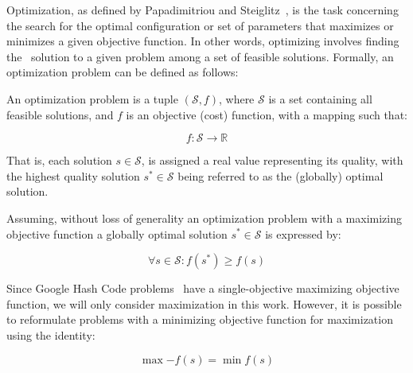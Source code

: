 Optimization, as defined by Papadimitriou and
Steiglitz~\cite{papadimitriou1998combinatorial}, is the task concerning the
search for the optimal configuration or set of parameters that maximizes or
minimizes a given objective function. In other words, optimizing involves
finding the~ solution to a given problem among a set of feasible
solutions. Formally, an optimization problem can be defined as follows:

\begin{definition}
  \label{def:optimization-problem}
  An optimization problem is a tuple $(\mathcal{S}, f)$, where
  $\mathcal{S}$ is a set containing all feasible solutions, and $f$ is an
  objective (cost) function, with a mapping such that:

  \begin{equation}
    \label{eq:optimization-problem}
    f \colon \mathcal{S} \longrightarrow \mathbb{R}
  \end{equation}

  That is, each solution $s \in \mathcal{S}$, is assigned a real value
  representing its quality, with the highest quality solution $s^{*} \in
    \mathcal{S}$ being referred to as the (globally) optimal solution.
\end{definition}

\begin{definition}
  \label{def:global-optimum}
  Assuming, without loss of generality an optimization problem with a maximizing
  objective function a globally optimal solution $s^* \in \mathcal{S}$ is
  expressed by:

  \begin{equation}
    \forall s \in \mathcal{S} \colon f(s^{*}) \geq f(s)
  \end{equation}

\end{definition}

Since Google Hash Code problems~\cite{llc2023codingcompetitionsarchive}
have a single-objective maximizing objective function, we will only consider
maximization in this work. However, it is possible to reformulate problems with
a minimizing objective function for maximization~\cite{nocedal2006numerical}
using the identity:

\begin{equation}
  \label{eq:max2min}
  \max{-f(s)} = \min{f(s)}
\end{equation}

